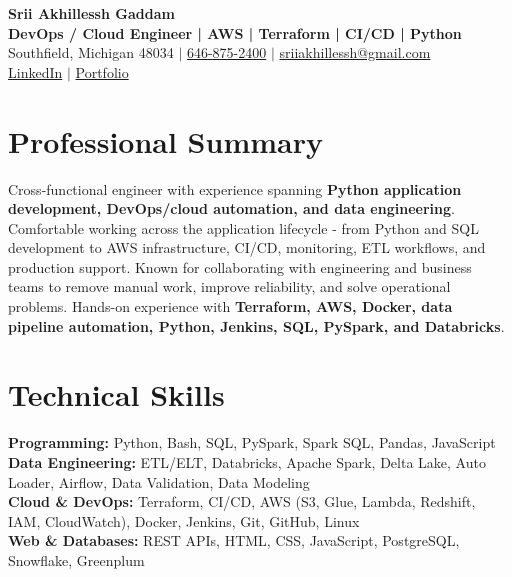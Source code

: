 \documentclass[letterpaper,10pt]{article}
\begin{document}
\fontsize{9.35pt}{10.45pt}\selectfont

\begin{center}
    {\LARGE \textbf{Srii Akhillessh Gaddam}} \\[-1pt]
    \textbf{DevOps / Cloud Engineer | AWS | Terraform | CI/CD | Python} \\[2pt]
    Southfield, Michigan 48034 $|$
    \href{tel:6468752400}{646-875-2400} $|$
    \href{mailto:sriiakhillessh@gmail.com}{sriiakhillessh@gmail.com} \\[1pt]
    \href{https://www.linkedin.com/in/srii-akhiilessh-gaddam-b48668191/}{LinkedIn} $|$
    \href{https://sriiakhillesshg.github.io/portfolio/}{Portfolio}
\end{center}
\vspace{-8pt}

\section{Professional Summary}
\small{Cross-functional engineer with experience spanning \textbf{Python application development, DevOps/cloud automation, and data engineering}. Comfortable working across the application lifecycle - from Python and SQL development to AWS infrastructure, CI/CD, monitoring, ETL workflows, and production support. Known for collaborating with engineering and business teams to remove manual work, improve reliability, and solve operational problems. Hands-on experience with \textbf{Terraform, AWS, Docker, data pipeline automation, Python, Jenkins, SQL, PySpark, and Databricks}.}

\section{Technical Skills}
\small{
\textbf{Programming:} Python, Bash, SQL, PySpark, Spark SQL, Pandas, JavaScript \\
\textbf{Data Engineering:} ETL/ELT, Databricks, Apache Spark, Delta Lake, Auto Loader, Airflow, Data Validation, Data Modeling \\
\textbf{Cloud \& DevOps:} Terraform, CI/CD, AWS (S3, Glue, Lambda, Redshift, IAM, CloudWatch), Docker, Jenkins, Git, GitHub, Linux \\
\textbf{Web \& Databases:} REST APIs, HTML, CSS, JavaScript, PostgreSQL, Snowflake, Greenplum
}
\end{document}
